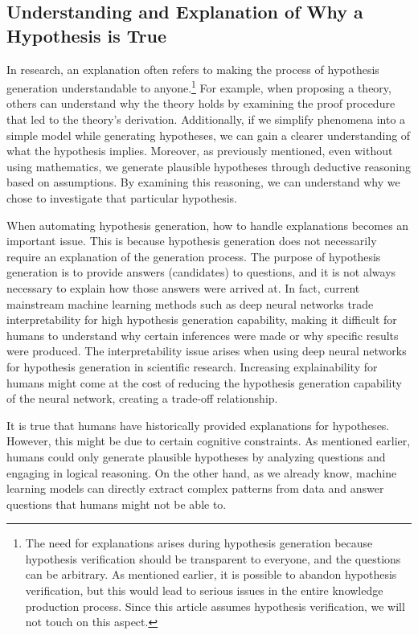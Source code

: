
\subsection{Understanding and Explanation of Why a Hypothesis is True}
In research, an explanation often refers to making the process of hypothesis generation understandable to anyone.\footnote{
The need for explanations arises during hypothesis generation because hypothesis verification should be transparent to everyone, and the questions can be arbitrary. As mentioned earlier, it is possible to abandon hypothesis verification, but this would lead to serious issues in the entire knowledge production process. Since this article assumes hypothesis verification, we will not touch on this aspect.
} For example, when proposing a theory, others can understand why the theory holds by examining the proof procedure that led to the theory's derivation. Additionally, if we simplify phenomena into a simple model while generating hypotheses, we can gain a clearer understanding of what the hypothesis implies. Moreover, as previously mentioned, even without using mathematics, we generate plausible hypotheses through deductive reasoning based on assumptions. By examining this reasoning, we can understand why we chose to investigate that particular hypothesis.

When automating hypothesis generation, how to handle explanations becomes an important issue. This is because hypothesis generation does not necessarily require an explanation of the generation process. The purpose of hypothesis generation is to provide answers (candidates) to questions, and it is not always necessary to explain how those answers were arrived at. In fact, current mainstream machine learning methods such as deep neural networks trade interpretability for high hypothesis generation capability, making it difficult for humans to understand why certain inferences were made or why specific results were produced. The interpretability issue arises when using deep neural networks for hypothesis generation in scientific research. Increasing explainability for humans might come at the cost of reducing the hypothesis generation capability of the neural network, creating a trade-off relationship.

It is true that humans have historically provided explanations for hypotheses. However, this might be due to certain cognitive constraints. As mentioned earlier, humans could only generate plausible hypotheses by analyzing questions and engaging in logical reasoning. On the other hand, as we already know, machine learning models can directly extract complex patterns from data and answer questions that humans might not be able to.

